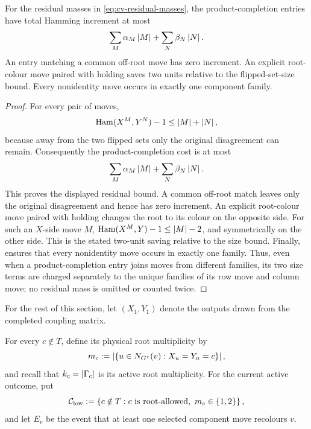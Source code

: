 \begin{lemma}
\label{lem:cv-completion-cost}
For the residual masses in \eqref{eq:cv-residual-masses}, the
product-completion entries have total Hamming increment at most
\[
  \sum_M\alpha_M\left|M\right|+\sum_N\beta_N\left|N\right|.
\]
An entry matching a common off-root move has zero increment.  An explicit
root-colour move paired with holding saves two units relative to the
flipped-set-size bound.
Every nonidentity move occurs in exactly one component family.
\end{lemma}

\begin{proof}
For every pair of moves,
\[
  \operatorname{Ham}(X^M,Y^N)-1\le\left|M\right|+\left|N\right|,
\]
because away from the two flipped sets only the original disagreement can
remain.  Consequently the product-completion cost is at most
\[
  \sum_M\alpha_M\left|M\right|+\sum_N\beta_N\left|N\right|.
\]
This proves the displayed residual bound.  A common off-root match leaves
only the original disagreement and hence has zero increment.  An explicit
root-colour move paired with holding changes the root to its colour on the
opposite side.  For such an $X$-side move $M$,
\(\operatorname{Ham}(X^M,Y)-1\le |M|-2\), and symmetrically on the other side.
This is the stated two-unit saving relative to the size bound.  Finally,
 ensures that every nonidentity move occurs in
exactly one family.  Thus, even when a product-completion entry joins moves
from different families, its two size terms are charged separately to the
unique families of its row move and column move; no residual mass is omitted
or counted twice.
\end{proof}

For the rest of this section, let \((X_1,Y_1)\) denote the outputs drawn
from the completed coupling matrix.

For every \(c\notin T\), define its physical root multiplicity by
\[
 m_c:=\left|\left\{u\in N_{G^\tau}(v):X_u=Y_u=c\right\}\right|,
\]
and recall that \(k_c=\left|\Gamma_c\right|\) is its active root multiplicity.
For the current active outcome, put
\[
 \mathcal C_{\rm low}:=
    \left\{c\notin T:c\text{ is root-allowed},\
                      m_c\in\left\{1,2\right\}\right\},
\]
and let \(E_v\) be the event that at least one selected component move
recolours \(v\).

